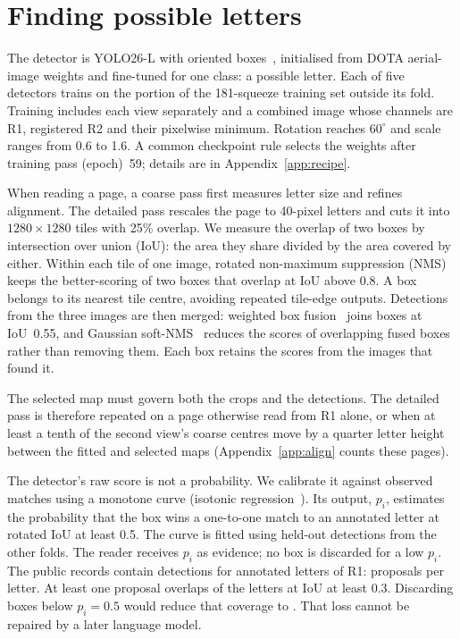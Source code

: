 \documentclass[11pt]{article}
\newcommand{\Rone}{\textsf{R1}}
\newcommand{\Rtwo}{\textsf{R2}}
\begin{document}
\section{Finding possible letters}
\label{sec:detector}
The detector is YOLO26-L with oriented boxes~\cite{yolo26}, initialised from DOTA aerial-image weights and
fine-tuned for one class: a possible letter. Each of five detectors trains on the portion of the
181-squeeze training set outside its fold. Training includes each view separately and a combined image whose channels are
\Rone{}, registered \Rtwo{} and their pixelwise minimum. Rotation reaches $60^\circ$ and scale ranges from
0.6 to 1.6. A common checkpoint rule selects the weights after training pass (epoch)~59;
details are in Appendix~\ref{app:recipe}.

When reading a page, a coarse pass first measures letter size and refines alignment. The detailed
pass rescales the page to 40-pixel letters and cuts it into $1280\times1280$ tiles with 25\% overlap.
We measure the overlap of two boxes by intersection over union (IoU): the area they share divided by the
area covered by either. Within each tile of one image, rotated non-maximum suppression (NMS) keeps the
better-scoring of two boxes that overlap at IoU above 0.8. A box belongs to its nearest tile centre,
avoiding repeated tile-edge outputs. Detections from the three images are then merged:
weighted box fusion~\cite{solovyev2021} joins boxes at IoU~0.55, and Gaussian soft-NMS~\cite{bodla2017}
reduces the scores of overlapping fused boxes rather than removing them. Each box retains the scores
from the images that found it.

The selected map must govern both the crops and the detections. The detailed pass is therefore repeated
on a page otherwise read from \Rone{} alone, or when at least a tenth of the second view's coarse centres
move by a quarter letter height between the fitted and selected maps (Appendix~\ref{app:align} counts
these pages).

The detector's raw score is not a probability. We calibrate it against observed matches using a monotone
curve (isotonic regression~\cite{zadrozny2002}). Its output, $p_i$, estimates the probability that the box
wins a one-to-one match to an annotated letter at rotated IoU at least 0.5. The curve is fitted using
held-out detections from the other folds. The reader receives $p_i$ as evidence; no box is discarded
for a low $p_i$. The public records contain
\DetectorDetections{} detections for \DetectorLetters{} annotated letters of \Rone{}: \DetectorPerLetter{}
proposals per letter. At least one proposal overlaps \DetectorCoverageClaim{} of the letters at IoU at least 0.3.
Discarding boxes below $p_i=0.5$ would reduce that coverage to \DetectorHalfCoverage{}.
That loss cannot be repaired by a later language model.
\end{document}
